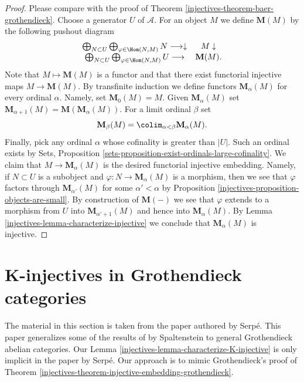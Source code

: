 \begin{proof}

Please compare with the proof of
Theorem \ref{injectives-theorem-baer-grothendieck}.
Choose a generator $U$ of $\mathcal{A}$. For an object $M$ we define
$\mathbf{M}(M)$ by the following pushout diagram
$$
\begin{array}{cc}\bigoplus_{N \subset U}
\bigoplus_{\varphi \in \Hom(N, M)}
N \longrightarrow\downarrow & M \downarrow \\ \bigoplus_{N \subset U}
\bigoplus_{\varphi \in \Hom(N, M)}
U \longrightarrow & \mathbf{M}(M).\end{array}
$$
Note that $M \mapsto \mathbf{M}(M)$ is a functor and that there
exist functorial injective maps $M \to \mathbf{M}(M)$. By transfinite
induction we define functors $\mathbf{M}_\alpha(M)$ for every
ordinal $\alpha$. Namely, set $\mathbf{M}_0(M) = M$. Given
$\mathbf{M}_\alpha(M)$ set
$\mathbf{M}_{\alpha + 1}(M) = \mathbf{M}(\mathbf{M}_\alpha(M))$.
For a limit ordinal $\beta$ set
$$
\mathbf{M}_\beta(M) = \colim_{\alpha < \beta} \mathbf{M}_\alpha(M).
$$
Finally, pick any ordinal $\alpha$ whose cofinality is greater than $|U|$.
Such an ordinal exists by
Sets, Proposition \ref{sets-proposition-exist-ordinals-large-cofinality}.
We claim that $M \to \mathbf{M}_\alpha(M)$ is the desired functorial
injective embedding. Namely, if $N \subset U$ is a subobject and
$\varphi : N \to \mathbf{M}_\alpha(M)$ is a morphism, then we see that
$\varphi$ factors through $\mathbf{M}_{\alpha'}(M)$ for some
$\alpha' < \alpha$ by
Proposition \ref{injectives-proposition-objects-are-small}.
By construction of $\mathbf{M}(-)$ we see that $\varphi$ extends to
a morphism from $U$ into $\mathbf{M}_{\alpha' + 1}(M)$ and hence into
$\mathbf{M}_\alpha(M)$. By
Lemma \ref{injectives-lemma-characterize-injective}
we conclude that $\mathbf{M}_\alpha(M)$ is injective.
\end{proof}

\section{K-injectives in Grothendieck categories}
\label{injectives-section-K-injective}
The material in this section is taken from the paper \cite{serpe}
authored by Serp\'e. This paper generalizes some of the results
of \cite{Spaltenstein} by Spaltenstein to general Grothendieck abelian
categories. Our Lemma \ref{injectives-lemma-characterize-K-injective}
is only implicit in the paper by Serp\'e. Our approach is to mimic
Grothendieck's proof of
Theorem \ref{injectives-theorem-injective-embedding-grothendieck}.

